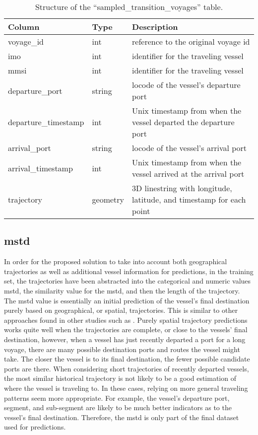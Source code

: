 \begin{table}[htbp]
    \centering
    \small{\begin{tabularx}{1.0\textwidth}{p{1.3in} p{0.75in} X}
        \bfseries{Column} & \bfseries{Type} & \bfseries{Description} \\ \toprule
        voyage\_id & int & reference to the original voyage id \\ \midrule
        imo & int & identifier for the traveling vessel\\ \midrule
        mmsi & int & identifier for the traveling vessel\\ \midrule
        departure\_port & string & \gls{locode} of the vessel's departure port \\ \midrule
        departure\_timestamp & int & Unix timestamp from when the vessel departed the departure port \\ \midrule
        arrival\_port & string & \gls{locode} of the vessel's arrival port \\ \midrule
        arrival\_timestamp & int & Unix timestamp from when the vessel arrived at the arrival port \\ \midrule
        trajectory & geometry & 3D linestring with longitude, latitude, and timestamp for each point \\ \bottomrule
    \end{tabularx}}
\caption{Structure of the ``sampled\_transition\_voyages'' table.}\label{tab:sampled_voyages}
\end{table}

\subsection{\acrfull{mstd}}

In order for the proposed solution to take into account both geographical trajectories as well as additional vessel information for predictions, in the training set, the trajectories have been abstracted into the categorical and numeric values \acrfull{mstd}, the similarity value for the \acrshort{mstd}, and then the length of the trajectory. The \acrshort{mstd} value is essentially an initial prediction of the vessel's final destination purely based on geographical, or spatial, trajectories. This is similar to other approaches found in other studies such as \cite{Zhang2020AISApproach}. Purely spatial trajectory predictions works quite well when the trajectories are complete, or close to the vessels' final destination, however, when a vessel has just recently departed a port for a long voyage, there are many possible destination ports and routes the vessel might take. The closer the vessel is to its final destination, the fewer possible candidate ports are there. When considering short trajectories of recently departed vessels, the most similar historical trajectory is not likely to be a good estimation of where the vessel is traveling to. In these cases, relying on more general traveling patterns seem more appropriate. For example, the vessel's departure port, segment, and sub-segment are likely to be much better indicators as to the vessel's final destination. Therefore, the \acrshort{mstd} is only part of the final dataset used for predictions.

